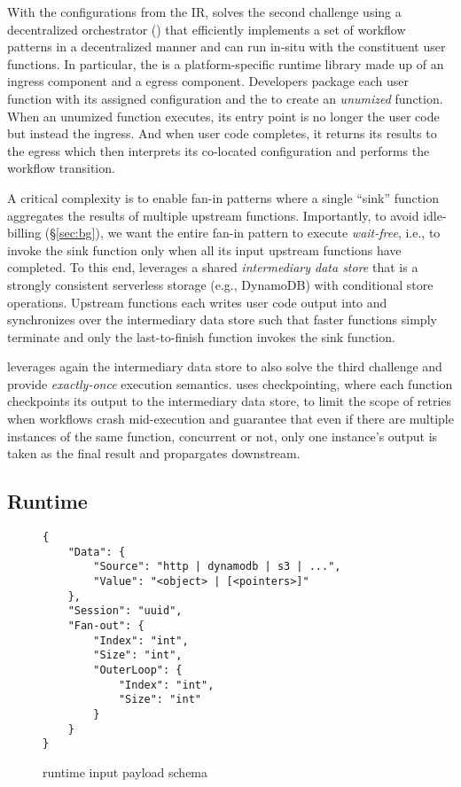 With the configurations from the IR, \name{} solves the second challenge using
a decentralized orchestrator (\deorc) that efficiently implements a set of
workflow patterns in a decentralized manner and can run in-situ with the
constituent user functions. In particular, the \deorc{} is a platform-specific
runtime library made up of an ingress component and a egress component.
Developers package each user function with its assigned \name{} configuration
and the \deorc{} to create an \emph{unumized} function. When an unumized
function executes, its entry point is no longer the user code but instead the
\deorc{} ingress. And when user code completes, it returns its results to the
\deorc{} egress which then interprets its co-located \name{} configuration and
performs the workflow transition.

A critical complexity is to enable fan-in patterns where a single ``sink''
function aggregates the results of multiple upstream functions. Importantly,
to avoid idle-billing (\S\ref{sec:bg}), we want the entire fan-in pattern to
execute \emph{wait-free}, i.e., to invoke the sink function only when all its
input upstream functions have completed. To this end, \name{} leverages a
shared \emph{intermediary data store} that is a strongly consistent serverless
storage (e.g., DynamoDB) with conditional store operations. Upstream functions
each writes user code output into and synchronizes over the intermediary data
store such that faster functions simply terminate and only the last-to-finish
function invokes the sink function.

\name{} leverages again the intermediary data store to also solve the third
challenge and provide \emph{exactly-once} execution semantics. \name{} uses
checkpointing, where each function checkpoints its output to the intermediary
data store, to limit the scope of retries when workflows crash mid-execution
and guarantee that even if there are multiple instances of the same function,
concurrent or not, only one instance's output is taken as the final result and
propargates downstream.








\subsection{\name{} Runtime}

\begin{figure}[]
    \begin{verbatim}
{
    "Data": {
        "Source": "http | dynamodb | s3 | ...",
        "Value": "<object> | [<pointers>]"
    },
    "Session": "uuid",
    "Fan-out": {
        "Index": "int",
        "Size": "int",
        "OuterLoop": {
            "Index": "int",
            "Size": "int"
        }
    }
}
    \end{verbatim}
    \caption{\name{} runtime input payload schema}
    \label{fig:input-format}
\end{figure}

